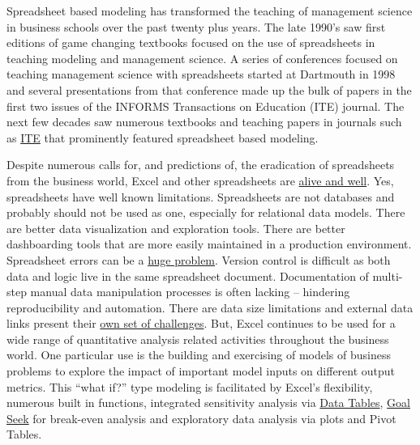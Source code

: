 \documentclass[ited,blindrev]{informs3}              %
\begin{document}
Spreadsheet based modeling has transformed the teaching of management science in business schools over the past twenty plus years. The late 1990's saw first editions of game changing textbooks \cite{winstonPracticalManagementScience2018,ragsdaleSpreadsheetModelingDecision2017} focused on the use of spreadsheets in teaching modeling and management science.  A series of conferences focused on teaching management science with spreadsheets started at Dartmouth in 1998 and several presentations from that conference made up the bulk of papers in the first two issues of the INFORMS Transactions on Education (ITE) journal. The next few decades saw numerous textbooks \cite{powellBusinessAnalyticsArt2019, camm2020business} and teaching papers in journals such as \href{https://pubsonline.informs.org/journal/ited}{ITE} that prominently featured spreadsheet based modeling.

Despite numerous calls for, and predictions of, the eradication of spreadsheets from the business world, Excel and other spreadsheets are \href{https://benn.substack.com/p/the-next-billion-programmers}{alive and well}. Yes, spreadsheets have well known limitations. Spreadsheets are not databases and probably should not be used as one, especially for relational data models. There are better data visualization and exploration tools. There are better dashboarding tools that are more easily maintained in a production environment. Spreadsheet errors can be a \href{https://eusprig.org/research-info/horror-stories/}{huge problem}. Version control is difficult as both data and logic live in the same spreadsheet document. Documentation of multi-step manual data manipulation processes is often lacking -- hindering reproducibility and automation. There are data size limitations and external data links present their \href{https://www.thespreadsheetguru.com/find-remove-external-links/}{own set of challenges}. But, Excel continues to be used for a wide range of quantitative analysis related activities throughout the business world. One particular use is the building and exercising of models of business problems
to explore the impact of important model inputs on different output metrics. This ``what if?'' type modeling is facilitated by Excel's flexibility, numerous built in functions, integrated sensitivity analysis via \href{https://support.microsoft.com/en-us/office/calculate-multiple-results-by-using-a-data-table-e95e2487-6ca6-4413-ad12-77542a5ea50b}{Data Tables},  \href{https://support.microsoft.com/en-us/office/use-goal-seek-to-find-the-result-you-want-by-adjusting-an-input-value-320cb99e-f4a4-417f-b1c3-4f369d6e66c7}{Goal
	Seek} for break-even analysis and exploratory data analysis via plots and Pivot Tables. 
\end{document}
